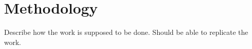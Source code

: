 \chapter{Methodology}\label{cha:method}

Describe how the work is supposed to be done. Should be able to replicate the work.

